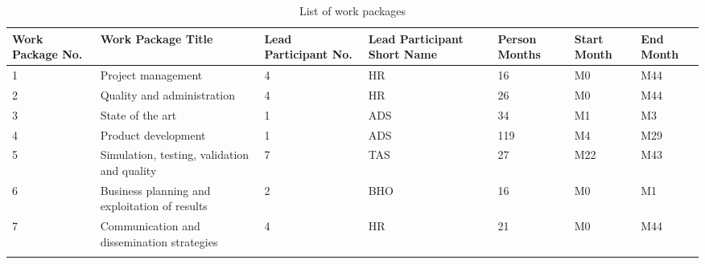 \begin{longtable}[H]{p{1.3cm} p{2.1cm} p{1.8cm} p{2cm} p{1.9cm} p{1.6cm} p{1.3cm}}
	\toprule[2pt]
	
	\textbf{Work Package No.} & \textbf{Work Package Title} & \textbf{Lead Participant No.} & \textbf{Lead Participant Short Name} & \textbf{Person Months} & \textbf{Start Month} & \textbf{End Month} \\
	
	\midrule[1.5pt] 
	\endhead
	
	 1& Project management & 4 & HR & 16 & M0 & M44 \vspace{0.2cm} \\
	
	\midrule

	 2& Quality and administration & 4 & HR &  26 & M0 & M44 \vspace{0.2cm} \\
	
	\midrule
	
	 3& State of the art & 1 & ADS & 34 & M1 & M3 \vspace{0.2cm} \\

	\midrule

 	 4& Product development & 1 & ADS & 119 & M4 & M29 \vspace{0.2cm} \\
 	 
 	 \midrule
 	 
 	 5& Simulation, testing, validation and quality & 7 & TAS & 27 & M22  & M43 \vspace{0.2cm} \\
 	 
 	 \midrule
 	 
 	 6& Business planning and exploitation of results & 2 & BHO & 16 & M0 & M1 \vspace{0.2cm} \\
 	 
 	 \midrule
 	 
 	 7& Communication and dissemination strategies & 4 & HR & 21 & M0 & M44 \vspace{0.2cm} \\
	
	\bottomrule[2pt]
	
	\caption{List of work packages}
	\label{workpackages}
\end{longtable}


